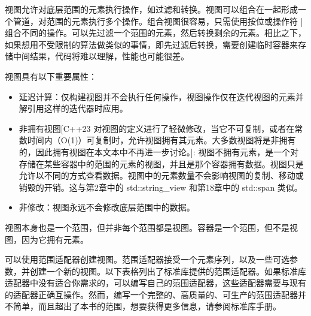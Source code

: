 
视图允许对底层范围的元素执行操作，如过滤和转换。视图可以组合在一起形成一个管道，对范围的元素执行多个操作。组合视图很容易，只需使用按位或操作符 | 组合不同的操作。可以先过滤一个范围的元素，然后转换剩余的元素。相比之下，如果想用不受限制的算法做类似的事情，即先过滤后转换，需要创建临时容器来存储中间结果，代码将难以理解，性能也可能很差。

视图具有以下重要属性：

\begin{itemize}
\item
延迟计算：仅构建视图并不会执行任何操作，视图操作仅在迭代视图的元素并解引用这样的迭代器时应用。

\item
非拥有视图[C++23 对视图的定义进行了轻微修改，当它不可复制，或者在常数时间内（O(1)）可复制时，允许视图拥有其元素。大多数视图将是非拥有的，因此拥有视图在本文本中不再进一步讨论。]: 视图不拥有元素，是一个对存储在某些容器中的范围的元素的视图，并且是那个容器拥有数据。视图只是允许以不同的方式查看数据。视图中的元素数量不会影响视图的复制、移动或销毁的开销。这与第2章中的 std::string\_view 和第18章中的 std::span 类似。

\item
非修改：视图永远不会修改底层范围中的数据。
\end{itemize}

视图本身也是一个范围，但并非每个范围都是视图。容器是一个范围，但不是视图，因为它拥有元素。

可以使用范围适配器创建视图。范围适配器接受一个元素序列，以及一些可选参数，并创建一个新的视图。以下表格列出了标准库提供的范围适配器。如果标准库适配器中没有适合你需求的，可以编写自己的范围适配器，这些适配器需要与现有的适配器正确互操作。然而，编写一个完整的、高质量的、可生产的范围适配器并不简单，而且超出了本书的范围，想要获得更多信息，请参阅标准库手册。

